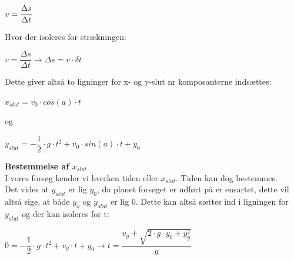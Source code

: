 \begin{center}
\begin{math}
\centering
v = \dfrac{\Delta s}{\Delta t}
\end{math}
\end{center}




Hvor der isoleres for strækningen:\\

\begin{center}
\begin{math}
v = \dfrac{\Delta s}{\Delta t} \longrightarrow \Delta s = v \cdot \delta t
\end{math}
\end{center}

Dette giver altså to ligninger for x- og y-slut nr komposanterne indsættes:\\

\begin{center}
\begin{math}
x_{slut} = v_{0} \cdot cos(a) \cdot t
\end{math}
\end{center}

og\\

\begin{center}
\begin{math}
y_{slut} = -\dfrac{1}{2} \cdot g \cdot t^{2} + v_{0} \cdot sin(a) \cdot t + y_{0}
\end{math}
\end{center}

\textbf{Bestemmelse af  $x_{slut}$}\\
I vores forsøg kender vi hverken tiden eller $x_{slut}$. Tiden kan dog bestemmes.\\

Det vides at $y_{slut}$ er lig $y_{0}$, da planet forsøget er udført på er ensartet, dette vil altså sige, at både $y_{o}$ og $y_{slut}$ er lig 0. Dette kan altså sættes ind i ligningen for $y_{slut}$ og der kan isoleres for t:\\

\begin{center}
\begin{math}
0 = -\dfrac{1}{2} \cdot g \cdot t^{2} + v_{y} \cdot t + y_{0} \longrightarrow t = \dfrac{v_{y} + \sqrt{2 \cdot g \cdot y_{0} + y^{2}_{y}}}{g}
\end{math}
\end{center}

